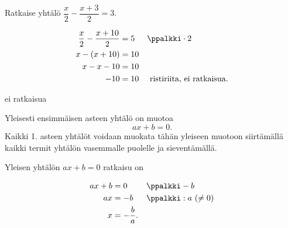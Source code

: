 \begin{esimerkki}
Ratkaise yhtälö $\dfrac{x}{2}-\dfrac{x+3}{2}=3$.

\begin{esimratk}
  \begin{align*}
    \frac{x}{2}-\frac{x+10}{2}&=5 && \ppalkki \cdot 2 \\
        x-(x+10) &= 10  \\
         x-x-10 &= 10 \\
         -10 &= 10 && \text{ ristiriita, ei ratkaisua.}
  \end{align*}
\end{esimratk}
\begin{esimvast}
ei ratkaisua
\end{esimvast}
\end{esimerkki}

Yleisesti ensimmäisen asteen yhtälö on muotoa
\[
    ax + b = 0.
\]
Kaikki 1. asteen yhtälöt voidaan muokata tähän yleiseen
muotoon siirtämällä kaikki termit yhtälön vasemmalle puolelle ja
sieventämällä.

Yleisen yhtälön $ax + b = 0$ ratkaisu on

\begin{align*}
	 ax + b &= 0  && \ppalkki -b\\
	 ax &= -b  && \ppalkki : a \ (\neq 0)\\
  x &= -\frac{b}{a}.
\end{align*}


